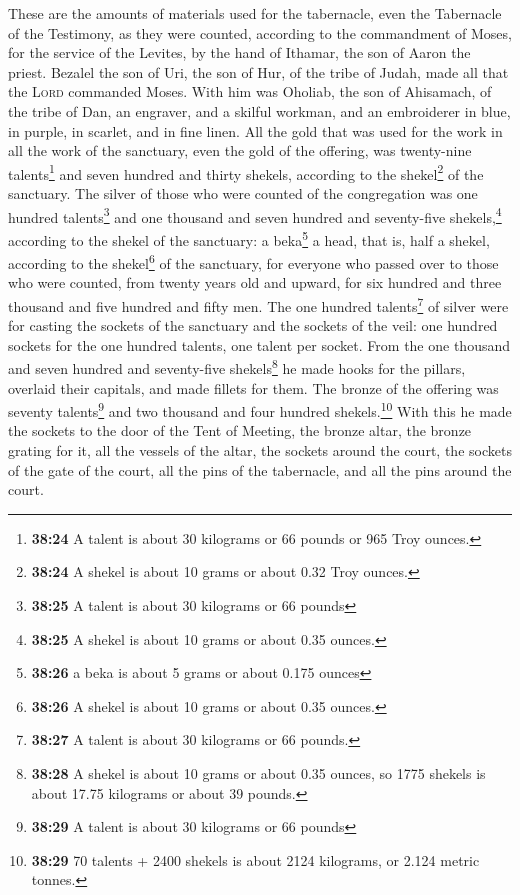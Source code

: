  These are the amounts of materials used for the
tabernacle, even the Tabernacle of the Testimony, as they were counted,
according to the commandment of Moses, for the service of the Levites,
by the hand of Ithamar, the son of Aaron the priest. 
Bezalel the son of Uri, the son of Hur, of the tribe of Judah, made all
that the \textsc{Lord} commanded Moses.  With him was
Oholiab, the son of Ahisamach, of the tribe of Dan, an engraver, and a
skilful workman, and an embroiderer in blue, in purple, in scarlet, and
in fine linen.  All the gold that was used for the work
in all the work of the sanctuary, even the gold of the offering, was
twenty-nine talents\footnote{\textbf{38:24} A talent is about 30
  kilograms or 66 pounds or 965 Troy ounces.} and seven hundred and
thirty shekels, according to the shekel\footnote{\textbf{38:24} A shekel
  is about 10 grams or about 0.32 Troy ounces.} of the sanctuary.
 The silver of those who were counted of the congregation
was one hundred talents\footnote{\textbf{38:25} A talent is about 30
  kilograms or 66 pounds} and one thousand and seven hundred and
seventy-five shekels,\footnote{\textbf{38:25} A shekel is about 10 grams
  or about 0.35 ounces.} according to the shekel of the sanctuary:
 a beka\footnote{\textbf{38:26} a beka is about 5 grams
  or about 0.175 ounces} a head, that is, half a shekel, according to
the shekel\footnote{\textbf{38:26} A shekel is about 10 grams or about
  0.35 ounces.} of the sanctuary, for everyone who passed over to those
who were counted, from twenty years old and upward, for six hundred and
three thousand and five hundred and fifty men.  The one
hundred talents\footnote{\textbf{38:27} A talent is about 30 kilograms
  or 66 pounds.} of silver were for casting the sockets of the sanctuary
and the sockets of the veil: one hundred sockets for the one hundred
talents, one talent per socket.  From the one thousand
and seven hundred and seventy-five shekels\footnote{\textbf{38:28} A
  shekel is about 10 grams or about 0.35 ounces, so 1775 shekels is
  about 17.75 kilograms or about 39 pounds.} he made hooks for the
pillars, overlaid their capitals, and made fillets for them.
 The bronze of the offering was seventy
talents\footnote{\textbf{38:29} A talent is about 30 kilograms or 66
  pounds} and two thousand and four hundred shekels.\footnote{\textbf{38:29}
  70 talents + 2400 shekels is about 2124 kilograms, or 2.124 metric
  tonnes.}  With this he made the sockets to the door of
the Tent of Meeting, the bronze altar, the bronze grating for it, all
the vessels of the altar,  the sockets around the court,
the sockets of the gate of the court, all the pins of the tabernacle,
and all the pins around the court.

